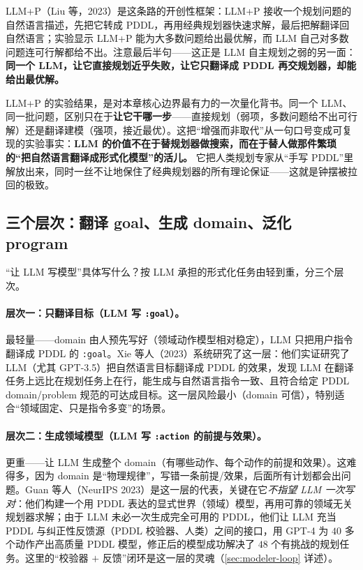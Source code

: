 LLM+P（Liu 等，2023）是这条路的开创性框架：LLM+P 接收一个规划问题的自然语言描述，先把它转成 PDDL，再用经典规划器快速求解，最后把解翻译回自然语言；实验显示 LLM+P 能为大多数问题给出最优解，而 LLM 自己对多数问题连可行解都给不出\cite{liu2023llmp}。注意最后半句——这正是 LLM 自主规划之弱的另一面：\textbf{同一个 LLM，让它直接规划近乎失败，让它只翻译成 PDDL 再交规划器，却能给出最优解。}

\begin{insight}
LLM+P 的实验结果，是对本章核心边界最有力的一次量化背书。同一个 LLM、同一批问题，区别只在于\textbf{让它干哪一步}——直接规划（弱项，多数问题给不出可行解）还是翻译建模（强项，接近最优）。这把“增强而非取代”从一句口号变成可复现的实验事实：\textbf{LLM 的价值不在于替规划器做搜索，而在于替人做那件繁琐的“把自然语言翻译成形式化模型”的活儿。} 它把人类规划专家从“手写 PDDL”里解放出来，同时一丝不让地保住了经典规划器的所有理论保证——这就是钟摆被拉回的极致。
\end{insight}

\subsection{三个层次：翻译 goal、生成 domain、泛化 program}
\label{sec:modeler-levels}

“让 LLM 写模型”具体写什么？按 LLM 承担的形式化任务由轻到重，分三个层次。

\paragraph{层次一：只翻译目标（LLM 写 \texttt{:goal}）。}
最轻量——domain 由人预先写好（领域动作模型相对稳定），LLM 只把用户指令翻译成 PDDL 的 \texttt{:goal}。Xie 等人（2023）系统研究了这一层：他们实证研究了 LLM（尤其 GPT-3.5）把自然语言目标翻译成 PDDL 的效果，发现 LLM 在翻译任务上远比在规划任务上在行，能生成与自然语言指令一致、且符合给定 PDDL domain/problem 规范的可达成目标\cite{xie2023translating}。这一层风险最小（domain 可信），特别适合“领域固定、只是指令多变”的场景。

\paragraph{层次二：生成领域模型（LLM 写 \texttt{:action} 的前提与效果）。}
更重——让 LLM 生成整个 domain（有哪些动作、每个动作的前提和效果）。这难得多，因为 domain 是“物理规律”，写错一条前提/效果，后面所有计划都会出问题。Guan 等人（NeurIPS 2023）是这一层的代表，关键在它\emph{不指望 LLM 一次写对}：他们构建一个用 PDDL 表达的显式世界（领域）模型，再用可靠的领域无关规划器求解；由于 LLM 未必一次生成完全可用的 PDDL，他们让 LLM 充当 PDDL 与纠正性反馈源（PDDL 校验器、人类）之间的接口，用 GPT-4 为 $40$ 多个动作产出高质量 PDDL 模型，修正后的模型成功解决了 $48$ 个有挑战的规划任务\cite{guan2023worldmodel}。这里的“校验器 $+$ 反馈”闭环是这一层的灵魂（\cref{sec:modeler-loop} 详述）。

